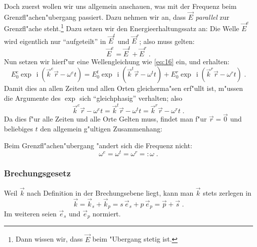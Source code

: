 \documentclass[twoside,a4paper]{book}
\newcommand{\I}{\ensuremath{\operatorname{i}}}
\begin{document}
Doch zuerst wollen wir uns allgemein anschauen, was mit der
{Frequenz} beim Grenzfl"achen"ubergang passiert. Dazu nehmen wir
an, dass $\vec E$ \emph{parallel} zur Grenzfl"ache
steht.\footnote{Dann wissen wir, dass $\vec E$ beim "Ubergang stetig ist.}
Dazu setzen wir
den Energieerhaltungssatz an: Die Welle $\vec E^e$ wird eigentlich nur
"`aufgeteilt"' in $\vec E^t$ und $\vec E^r$; also muss gelten:
\begin{equation}
   \label{eq:40}
    \vec  E^e = \vec E^t + \vec E^r \;.
\end{equation}
Nun setzen wir hierf"ur eine Wellengleichung wie \eqref{eq:16} ein,
und erhalten:
\begin{equation}
   \label{eq:39}
   E_0^e \exp \, \I (\vec k^e \vec r - \omega^e t)
=
   E_0^t \exp \, \I (\vec k^t \vec r - \omega^t t) +    E_0^r \exp \,
   \I (\vec k^r \vec r - \omega^r t) \;.
\end{equation}
Damit dies an allen Zeiten und allen Orten gleicherma"sen erf"ullt
ist, m"ussen die Argumente des $\exp$ sich "`gleichphasig"' verhalten;
also
\begin{equation*}
     \vec k^e \vec r - \omega^e t
=
   \vec k^t \vec r - \omega^t t = \vec k^r \vec r - \omega^r t \;.
\end{equation*}
Da dies f"ur alle Zeiten und alle Orte Gelten muss, findet man f"ur
$\vec r = \vec 0$ und beliebiges $t$ den allgemein g"ultigen Zusammenhang:
\begin{Wichtig}
   Beim Grenzfl"achen"ubergang "andert sich die Frequenz  nicht:
\begin{equation}
   \label{eqn_frequenz-bei-brechung}
   \boxed{  \omega^e = \omega^t = \omega^r =: \omega } \;.
\end{equation}
\end{Wichtig}






\subsubsection{Brechungsgesetz}
\label{kap_brechungsgesetz}

Weil $\vec k$ nach Definition in der Brechungsebene liegt, kann man
$\vec k$ stets zerlegen in 
\begin{equation*}
   \vec k = \vec k_s + \vec k_p = s \, \vec e_s + p \, \vec e_p = \vec
   p + \vec s\;.
\end{equation*}
Im weiteren seien $\vec e_s$ und $\vec e_p$ normiert.
\end{document}
